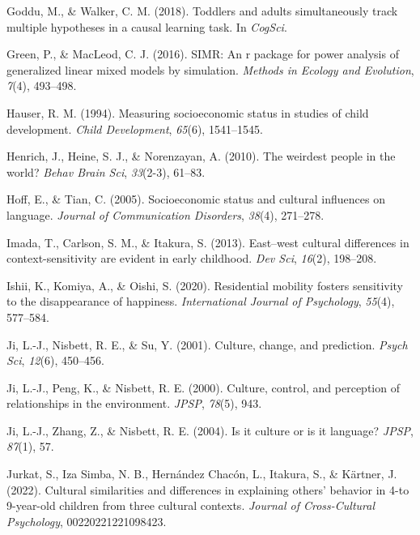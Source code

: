 \documentclass[
  man,floatsintext]{apa6}
\newlength{\cslhangindent}
\newlength{\cslentryspacingunit} %
\newenvironment{CSLReferences}[2] %
 {%
  \setlength{\parindent}{0pt}
  \ifodd #1
  \let\oldpar\par
  \def\par{\hangindent=\cslhangindent\oldpar}
  \fi
  \setlength{\parskip}{#2\cslentryspacingunit}
 }%
 {}
\begin{document}
\begin{CSLReferences}{1}{0}
\leavevmode{}%
Goddu, M., \& Walker, C. M. (2018). Toddlers and adults simultaneously track multiple hypotheses in a causal learning task. In \emph{CogSci}.

\leavevmode{}%
Green, P., \& MacLeod, C. J. (2016). SIMR: An r package for power analysis of generalized linear mixed models by simulation. \emph{Methods in Ecology and Evolution}, \emph{7}(4), 493--498.

\leavevmode{}%
Hauser, R. M. (1994). Measuring socioeconomic status in studies of child development. \emph{Child Development}, \emph{65}(6), 1541--1545.

\leavevmode{}%
Henrich, J., Heine, S. J., \& Norenzayan, A. (2010). The weirdest people in the world? \emph{Behav Brain Sci}, \emph{33}(2-3), 61--83.

\leavevmode{}%
Hoff, E., \& Tian, C. (2005). Socioeconomic status and cultural influences on language. \emph{Journal of Communication Disorders}, \emph{38}(4), 271--278.

\leavevmode{}%
Imada, T., Carlson, S. M., \& Itakura, S. (2013). East--west cultural differences in context-sensitivity are evident in early childhood. \emph{Dev Sci}, \emph{16}(2), 198--208.

\leavevmode{}%
Ishii, K., Komiya, A., \& Oishi, S. (2020). Residential mobility fosters sensitivity to the disappearance of happiness. \emph{International Journal of Psychology}, \emph{55}(4), 577--584.

\leavevmode{}%
Ji, L.-J., Nisbett, R. E., \& Su, Y. (2001). Culture, change, and prediction. \emph{Psych Sci}, \emph{12}(6), 450--456.

\leavevmode{}%
Ji, L.-J., Peng, K., \& Nisbett, R. E. (2000). Culture, control, and perception of relationships in the environment. \emph{JPSP}, \emph{78}(5), 943.

\leavevmode{}%
Ji, L.-J., Zhang, Z., \& Nisbett, R. E. (2004). Is it culture or is it language? \emph{JPSP}, \emph{87}(1), 57.

\leavevmode{}%
Jurkat, S., Iza Simba, N. B., Hernández Chacón, L., Itakura, S., \& Kärtner, J. (2022). Cultural similarities and differences in explaining others' behavior in 4-to 9-year-old children from three cultural contexts. \emph{Journal of Cross-Cultural Psychology}, 00220221221098423.


\end{CSLReferences}
\end{document}
